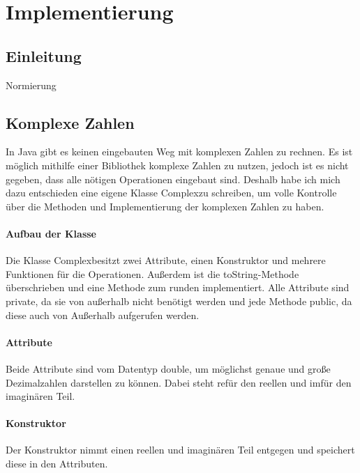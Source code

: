 \documentclass[12pt]{article}
\begin{document}
\section{Implementierung}
\subsection{Einleitung}
Normierung
\subsection{Komplexe Zahlen}
In Java gibt es keinen eingebauten Weg mit komplexen Zahlen zu rechnen. Es ist möglich mithilfe einer Bibliothek komplexe Zahlen zu nutzen, jedoch ist es nicht gegeben, dass alle nötigen Operationen eingebaut sind. Deshalb habe ich mich dazu entschieden eine eigene Klasse \glqq Complex\grqq\space zu schreiben, um volle Kontrolle über die Methoden und Implementierung der komplexen Zahlen zu haben.

\paragraph{Aufbau der Klasse}
Die Klasse \glqq Complex\grqq\space besitzt zwei Attribute, einen Konstruktor und mehrere Funktionen für die Operationen. Außerdem ist die \glqq toString\grqq-Methode überschrieben und eine Methode zum runden implementiert. Alle Attribute sind \glqq private\grqq, da sie von außerhalb nicht benötigt werden und jede Methode \glqq public\grqq, da diese auch von Außerhalb aufgerufen werden.

\paragraph{Attribute}
Beide Attribute sind vom Datentyp \glqq double\grqq, um möglichst genaue und große Dezimalzahlen darstellen zu können. Dabei steht \glqq re\grqq\space für den reellen und \glqq im\grqq\space für den imaginären Teil.

\paragraph{Konstruktor}
Der Konstruktor nimmt einen reellen und imaginären Teil entgegen und speichert diese in den Attributen.
\end{document}
